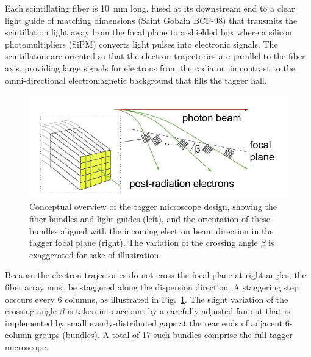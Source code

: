Each scintillating fiber is 10~mm long, fused at its downstream end to
a clear light guide of matching dimensions (Saint Gobain BCF-98) that
transmits the scintillation light away from the focal plane to a shielded box where
a silicon photomultipliers (SiPM) converts light pulses into electronic signals. The
scintillators are oriented so that the electron trajectories are parallel to the
fiber axis, providing large signals for electrons from the radiator, in contrast
to the omni-directional electromagnetic background that fills the tagger hall.

\begin{figure}[tbh]
\begin{center}
 \includegraphics[clip=true,width=0.95\linewidth]{figures/TAGM_conceptual.pdf}
\end{center}
\caption{
Conceptual overview of the tagger microscope design, showing the fiber bundles and
light guides (left), and the orientation of these bundles aligned with the incoming
electron beam direction in the tagger focal plane (right). The variation of the
crossing angle $\beta$ is exaggerated for sake of illustration.
        }
\label{fig:TAGM_conceptual}
\end{figure}

Because the electron trajectories do not cross the focal plane at right angles, the
fiber array must be staggered along the dispersion direction. A staggering step
occcurs every 6 columns, as illustrated in Fig.~\ref{fig:TAGM_conceptual}. The slight
variation of the crossing angle $\beta$ is taken into account by a carefully adjusted
fan-out that is implemented by small evenly-distributed gaps at the rear ends of 
adjacent 6-column groups (bundles). A total of 17 such bundles comprise the full
tagger microscope.

